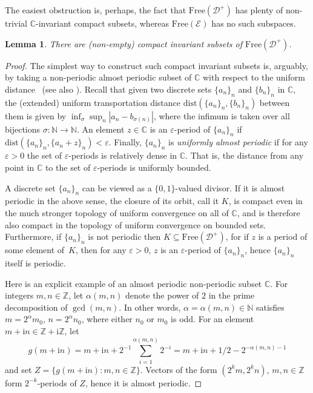 \documentclass[12pt]{paper}
\numberwithin{equation}{section}
\theoremstyle{plain}
\newtheorem{lemma}[theorem]{Lemma}
\theoremstyle{definition}
\newcommand{\C}{\mathbb{C}}
\newcommand{\N}{\mathbb{N}}
\newcommand{\Z}{\mathbb{Z}}
\newcommand{\im}{\mathrm{i}} %
\newcommand{\holom}[1][]{\mathcal{E}_{#1}}
\newcommand{\divis}[1][]{\mathcal{D}_{#1}}
\newcommand{\divisp}[1][]{\divis[#1]^{+}}
\newcommand{\free}{\mathrm{Free}}
\newcommand{\dist}{\textrm{dist}}
\renewcommand{\epsilon}{\varepsilon}
\begin{document}
The easiest obstruction is, perhaps, the fact that \(\free(\divisp)\) has plenty of non-trivial
\(\C\)-invariant compact subsets, whereas \(\free(\holom)\) has no such subspaces.

\begin{lemma}
  \label{lem:compact-invariant-divisors}
  There are (non-empty) compact invariant subsets of \(\free(\divisp)\).
\end{lemma}

\begin{proof}
  The simplest way to construct such compact invariant subsets is, arguably, by taking a
  non-periodic almost periodic subset of \(\C\) with respect to the uniform
  distance~\cite{kolbasinaPropertyDiscreteSets2008} (see also
  \cite{favorovAlmostPeriodicDiscrete2010a}).  Recall that given two discrete sets \(\{a_{n}\}_{n}\)
  and \(\{b_{n}\}_{n}\) in \(\C\), the (extended) uniform transportation distance
  \(\dist(\{a_{n}\}_{n}, \{b_{n}\}_{n})\) between them is given by
  \(\inf_{\sigma} \sup_{n} |a_{n} - b_{\sigma(n)}|\), where the infimum is taken over all bijections
  \(\sigma : \N \to \N\).  An element \(z \in \C\) is an \(\epsilon\)-period of \(\{a_{n}\}_{n}\) if
  \(\dist(\{a_{n}\}_{n}, \{a_{n} + z\}_{n}) < \epsilon\).  Finally, \(\{a_{n}\}_{n}\) is
  \emph{uniformly almost periodic} if for any \(\epsilon > 0\) the set of \(\epsilon\)-periods is
  relatively dense in \(\C\). That is, the distance from any point in \(\C\) to the set of
  \(\epsilon\)-periods is uniformly bounded.

  A discrete set \(\{a_{n}\}_{n}\) can be viewed as a \(\{0,1\}\)-valued divisor.  If it is almost
  periodic in the above sense, the closure of its orbit, call it \(K\), is compact even in the much
  stronger topology of uniform convergence on all of \(\C\), and is therefore also compact in the
  topology of uniform convergence on bounded sets.  Furthermore, if \(\{a_{n}\}_{n}\) is not
  periodic then \(K \subseteq \free(\divisp)\), for if \(z\) is a period of some element of~\(K\),
  then for any \(\epsilon > 0\), \(z\) is an \(\epsilon\)-period of \(\{a_{n}\}_{n}\), hence
  \(\{a_{n}\}_{n}\) itself is periodic.

  Here is an explicit example of an almost periodic non-periodic subset \(\C\).  For integers
  \(m,n \in \Z\), let \(\alpha(m,n)\) denote the power of \(2\) in the prime decomposition of
  \(\gcd(m,n)\).  In other words, \(\alpha = \alpha(m,n) \in \N\) satisfies \(m = 2^{\alpha}m_{0}\),
  \(n = 2^{\alpha}n_{0}\), where either \(n_{0}\) or \(m_{0}\) is odd.  For an element
  \(m + \im n \in \Z + \im \Z\), let
  \[g(m+\im n) = m+ \im n + 2^{-1}\sum_{i=1}^{\alpha(m,n)}2^{-i} = m+ \im n + 1/2 -
    2^{-\alpha(m,n)-1}\]
  and set \(Z = \{ g(m+\im n) : m,n \in \Z\}\).  Vectors of the form \((2^{k}m, 2^{k}n)\),
  \(m,n \in \Z\) form \(2^{-k}\)-periods of \(Z\), hence it is almost periodic.
\end{proof}
\end{document}
